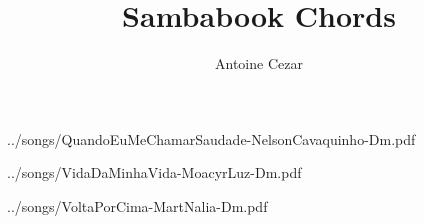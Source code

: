 \documentclass{article}
\title{Sambabook Chords}
\author{Antoine Cezar}
\begin{document}

    \maketitle
    \thispagestyle{empty}

    \newpage
    \thispagestyle{empty}
    \tableofcontents

    \clearpage
    \setcounter{page}{1}

     {../songs/QuandoEuMeChamarSaudade-NelsonCavaquinho-Dm.pdf}

     {../songs/VidaDaMinhaVida-MoacyrLuz-Dm.pdf}

     {../songs/VoltaPorCima-MartNalia-Dm.pdf}
\end{document}
